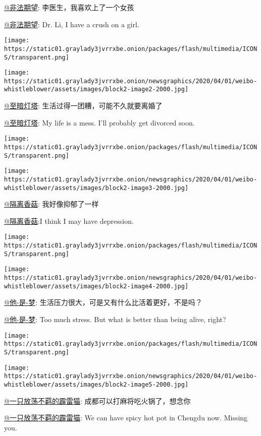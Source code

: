 \href{https://www.weibo.com/u/6222171704}{@非法期望}:
李医生，我喜欢上了一个女孩

\href{https://www.weibo.com/u/6222171704}{@非法期望}: Dr. Li, I have a
crush on a girl.

\texttt{[image: https://static01.graylady3jvrrxbe.onion/packages/flash/multimedia/ICONS/transparent.png]}

\texttt{[image: https://static01.graylady3jvrrxbe.onion/newsgraphics/2020/04/01/weibo-whistleblower/assets/images/block2-image2-2000.jpg]}

\href{https://www.weibo.com/u/6882286037}{@至暗灯塔}:
生活过得一团糟，可能不久就要离婚了

\href{https://www.weibo.com/u/6882286037}{@至暗灯塔}: My life is a mess.
I'll probably get divorced soon.

\texttt{[image: https://static01.graylady3jvrrxbe.onion/packages/flash/multimedia/ICONS/transparent.png]}

\texttt{[image: https://static01.graylady3jvrrxbe.onion/newsgraphics/2020/04/01/weibo-whistleblower/assets/images/block2-image3-2000.jpg]}

\href{https://www.weibo.com/u/6045930806}{@隔离香菇}: 我好像抑郁了一样

\href{https://www.weibo.com/u/6045930806}{@隔离香菇}:I think I may have
depression.

\texttt{[image: https://static01.graylady3jvrrxbe.onion/packages/flash/multimedia/ICONS/transparent.png]}

\texttt{[image: https://static01.graylady3jvrrxbe.onion/newsgraphics/2020/04/01/weibo-whistleblower/assets/images/block2-image4-2000.jpg]}

\href{https://www.weibo.com/u/3867150796}{@他-是-梦}:
生活压力很大，可是又有什么比活着更好，不是吗？

\href{https://www.weibo.com/u/3867150796}{@他-是-梦}: Too much stress.
But what is better than being alive, right?

\texttt{[image: https://static01.graylady3jvrrxbe.onion/packages/flash/multimedia/ICONS/transparent.png]}

\texttt{[image: https://static01.graylady3jvrrxbe.onion/newsgraphics/2020/04/01/weibo-whistleblower/assets/images/block2-image5-2000.jpg]}

\href{https://www.weibo.com/u/1908942383}{@一只放荡不羁的霹雷猫}:
成都可以打麻将吃火锅了，想念你

\href{https://www.weibo.com/u/1908942383}{@一只放荡不羁的霹雷猫}: We can
have spicy hot pot in Chengdu now. Missing you.

